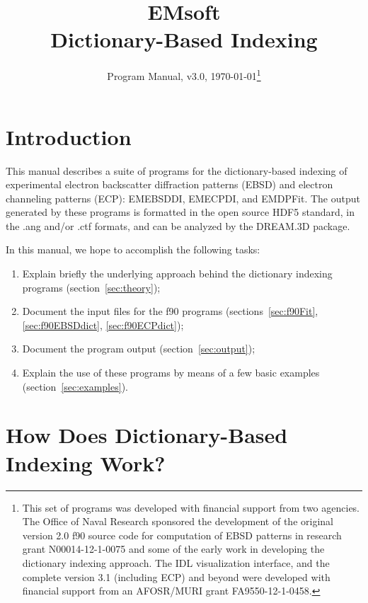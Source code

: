 \documentclass[DIV=calc, paper=letter, fontsize=11pt]{scrartcl}	 %
\title{EMsoft\\ Dictionary-Based Indexing} %
\author{\vspace*{-0.7in}} %
\date{Program Manual, v3.0, \today\protect\footnote{This set of programs was developed with financial support from two agencies. 
The Office of Naval Research sponsored the development of the original version 2.0 f90 source code for computation of EBSD patterns in research 
grant N00014-12-1-0075 and some of the early work in developing the dictionary indexing approach.  
The IDL visualization interface, and the complete version 3.1 (including ECP) and beyond were developed with financial 
support from an AFOSR/MURI grant FA9550-12-1-0458.}}
\begin{document}
\maketitle

\vspace*{-0.5in}\begin{figure*}[h]
\leavevmode\centering
\epsfxsize=4.0in
\end{figure*}

\renewcommand{\contentsname}{Table of Contents}
{\vspace*{-0.1in}\footnotesize\tableofcontents}

\newpage
\section{Introduction}
This manual describes a suite of programs for the dictionary-based indexing of experimental electron backscatter diffraction patterns (EBSD) and electron channeling patterns (ECP):
\textsf{EMEBSDDI}, \textsf{EMECPDI}, and \textsf{EMDPFit}.
The output generated by these programs is formatted in the open source HDF5 standard, in the \textsf{.ang} and/or \textsf{.ctf} formats, and
can be analyzed by the DREAM.3D package.

In this manual, we hope to accomplish the following tasks:
\begin{enumerate}
	\item Explain briefly the underlying approach behind the dictionary indexing programs (section~\ref{sec:theory});
	\item Document the input files for the f90 programs (sections~\ref{sec:f90Fit}, \ref{sec:f90EBSDdict}, \ref{sec:f90ECPdict});
	\item Document the program output (section~\ref{sec:output});
	\item Explain the use of these programs by means of a few basic examples (section~\ref{sec:examples}).
\end{enumerate}

\newpage
\section{How Does Dictionary-Based Indexing Work?\label{sec:theory}}
\end{document}
